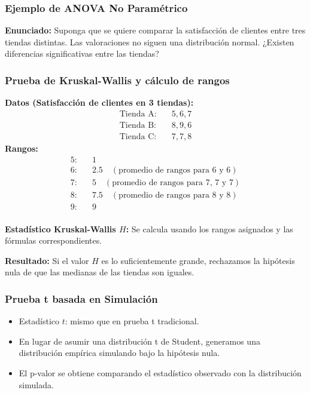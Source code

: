\documentclass[aspectratio=169]{beamer}
\begin{document}
\begin{frame}
\frametitle{Ejemplo de ANOVA No Paramétrico}
\textbf{Enunciado:} Suponga que se quiere comparar la satisfacción de clientes entre tres tiendas distintas. Las valoraciones no siguen una distribución normal. ¿Existen diferencias significativas entre las tiendas?
\end{frame}



\begin{frame}
\frametitle{Prueba de Kruskal-Wallis y cálculo de rangos}
\textbf{Datos (Satisfacción de clientes en 3 tiendas):}
\begin{align*}
\text{Tienda A:} & \quad 5, 6, 7 \\
\text{Tienda B:} & \quad 8, 9, 6 \\
\text{Tienda C:} & \quad 7, 7, 8 
\end{align*}
\textbf{Rangos:}
\begin{align*}
\text{5:} & \quad 1 \\
\text{6:} & \quad 2.5 \quad (\text{promedio de rangos para 6 y 6}) \\
\text{7:} & \quad 5 \quad (\text{promedio de rangos para 7, 7 y 7}) \\
\text{8:} & \quad 7.5 \quad (\text{promedio de rangos para 8 y 8}) \\
\text{9:} & \quad 9 \\
\end{align*}

\textbf{Estadístico Kruskal-Wallis \( H \):} Se calcula usando los rangos asignados y las fórmulas correspondientes. 

\textbf{Resultado:} Si el valor \( H \) es lo suficientemente grande, rechazamos la hipótesis nula de que las medianas de las tiendas son iguales.

\end{frame}


\begin{frame}
\frametitle{Prueba t basada en Simulación}
\begin{itemize}
\item Estadístico \( t \): mismo que en prueba t tradicional.
\item En lugar de asumir una distribución t de Student, generamos una distribución empírica simulando bajo la hipótesis nula.
\item El p-valor se obtiene comparando el estadístico observado con la distribución simulada.
\end{itemize}
\end{frame}
\end{document}

